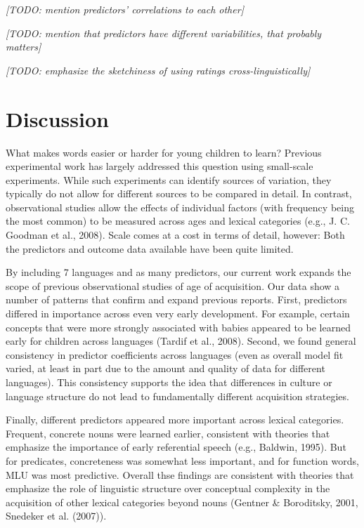 \documentclass[10pt, letterpaper]{article}
\begin{document}
\emph{{[}TODO: mention predictors' correlations to each other{]}}

\emph{{[}TODO: mention that predictors have different variabilities,
that probably matters{]}}

\emph{{[}TODO: emphasize the sketchiness of using ratings
cross-linguistically{]}}

\section{Discussion}\label{discussion}

What makes words easier or harder for young children to learn? Previous
experimental work has largely addressed this question using small-scale
experiments. While such experiments can identify sources of variation,
they typically do not allow for different sources to be compared in
detail. In contrast, observational studies allow the effects of
individual factors (with frequency being the most common) to be measured
across ages and lexical categories (e.g., J. C. Goodman et al., 2008).
Scale comes at a cost in terms of detail, however: Both the predictors
and outcome data available have been quite limited.

By including 7 languages and as many predictors, our current work
expands the scope of previous observational studies of age of
acquisition. Our data show a number of patterns that confirm and expand
previous reports. First, predictors differed in importance across even
very early development. For example, certain concepts that were more
strongly associated with babies appeared to be learned early for
children across languages (Tardif et al., 2008). Second, we found
general consistency in predictor coefficients across languages (even as
overall model fit varied, at least in part due to the amount and quality
of data for different languages). This consistency supports the idea
that differences in culture or language structure do not lead to
fundamentally different acquisition strategies.

Finally, different predictors appeared more important across lexical
categories. Frequent, concrete nouns were learned earlier, consistent
with theories that emphasize the importance of early referential speech
(e.g., Baldwin, 1995). But for predicates, concreteness was somewhat
less important, and for function words, MLU was most predictive. Overall
thse findings are consistent with theories that emphasize the role of
linguistic structure over conceptual complexity in the acquisition of
other lexical categories beyond nouns (Gentner \& Boroditsky, 2001,
Snedeker et al. (2007)).
\end{document}
